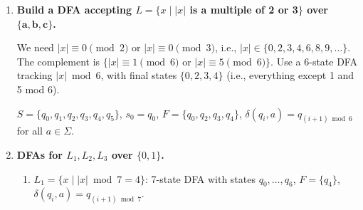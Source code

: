 \documentclass[11pt,openany]{book}
\begin{document}
\begin{enumerate}[{1.}1.]
\begin{enumerate}
\item The language is
\[
L(A)=\Sigma^*\pmb{0}(\pmb{11})^* \cup \pmb{1}(\pmb{11})^*,
\qquad \Sigma=\{\pmb{0},\pmb{1}\}.
\]
Equivalently, a word is accepted iff it either ends in $\pmb{0}$ followed by an even number of trailing $\pmb{1}$s, or consists entirely of an odd number of $\pmb{1}$s.
\end{enumerate}

\item \textbf{Build a DFA accepting $L = \{x \mid |x|$ is a multiple of 2 or 3$\}$ over $\{\mathbf{a},\mathbf{b},\mathbf{c}\}$.}

We need $|x| \equiv 0\pmod{2}$ or $|x|\equiv 0\pmod{3}$, i.e., $|x| \in \{0,2,3,4,6,8,9,\ldots\}$. The complement is $\{|x|\equiv 1\pmod{6}$ or $|x|\equiv 5\pmod{6}\}$. Use a 6-state DFA tracking $|x|\bmod 6$, with final states $\{0,2,3,4\}$ (i.e., everything except 1 and 5 mod 6).

$S = \{q_0,q_1,q_2,q_3,q_4,q_5\}$, $s_0 = q_0$, $F = \{q_0,q_2,q_3,q_4\}$, $\delta(q_i, a) = q_{(i+1)\bmod 6}$ for all $a\in\Sigma$.

\begin{center}
\end{center}

\item \textbf{DFAs for $L_1, L_2, L_3$ over $\{0,1\}$.}

\begin{enumerate}
\item $L_1 = \{x \mid |x|\bmod 7 = 4\}$: 7-state DFA with states $q_0,\ldots,q_6$, $F=\{q_4\}$, $\delta(q_i,a)=q_{(i+1)\bmod 7}$.


\end{enumerate}
\end{enumerate}
\end{document}
